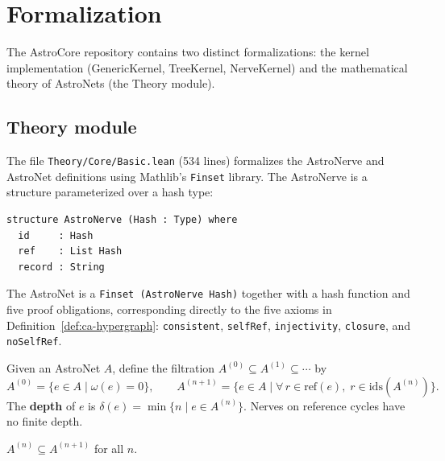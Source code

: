 \section{Formalization}\label{sec:formalization}

The AstroCore repository contains two distinct formalizations: the kernel implementation (GenericKernel, TreeKernel, NerveKernel) and the mathematical theory of AstroNets (the Theory module).

\subsection{Theory module}

The file \texttt{Theory/Core/Basic.lean} (534 lines) formalizes the AstroNerve and AstroNet definitions using Mathlib's \texttt{Finset} library.  The AstroNerve is a structure parameterized over a hash type:

\begin{lstlisting}[language={},morekeywords={structure,where,deriving}]
structure AstroNerve (Hash : Type) where
  id     : Hash
  ref    : List Hash
  record : String
\end{lstlisting}

The AstroNet is a \texttt{Finset (AstroNerve Hash)} together with a hash function and five proof obligations, corresponding directly to the five axioms in Definition~\ref{def:ca-hypergraph}: \texttt{consistent}, \texttt{selfRef}, \texttt{injectivity}, \texttt{closure}, and \texttt{noSelfRef}.

\begin{definition}
Given an AstroNet $A$, define the filtration $A^{(0)} \subseteq A^{(1)} \subseteq \cdots$ by
\[
  A^{(0)} = \{ e \in A \mid \omega(e) = 0 \}, \qquad
  A^{(n+1)} = \{ e \in A \mid \forall\, r \in \mathrm{ref}(e),\; r \in \mathrm{ids}(A^{(n)}) \}.
\]
The \textbf{depth} of $e$ is $\delta(e) = \min\{n \mid e \in A^{(n)}\}$.  Nerves on reference cycles have no finite depth.
\end{definition}

\begin{theorem}[Monotonicity]
$A^{(n)} \subseteq A^{(n+1)}$ for all $n$.
\end{theorem}

